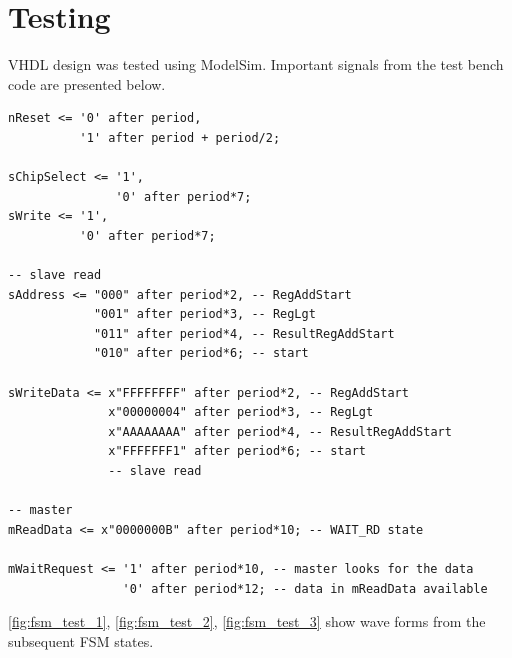 \section{Testing}
VHDL design was tested using ModelSim. Important signals from the test bench code are presented below.
\begin{verbatim}
nReset <= '0' after period,
          '1' after period + period/2;

sChipSelect <= '1',
               '0' after period*7;
sWrite <= '1',
          '0' after period*7;

-- slave read
sAddress <= "000" after period*2, -- RegAddStart
            "001" after period*3, -- RegLgt
            "011" after period*4, -- ResultRegAddStart
            "010" after period*6; -- start

sWriteData <= x"FFFFFFFF" after period*2, -- RegAddStart
              x"00000004" after period*3, -- RegLgt
              x"AAAAAAAA" after period*4, -- ResultRegAddStart
              x"FFFFFFF1" after period*6; -- start
              -- slave read

-- master 
mReadData <= x"0000000B" after period*10; -- WAIT_RD state

mWaitRequest <= '1' after period*10, -- master looks for the data
                '0' after period*12; -- data in mReadData available 
\end{verbatim}
\figurename{} \ref{fig:fsm_test_1}, \ref{fig:fsm_test_2}, \ref{fig:fsm_test_3} show wave forms from the subsequent FSM states. 

